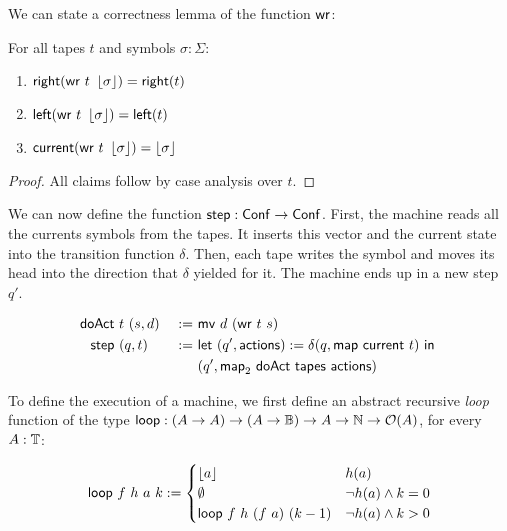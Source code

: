 We can state a correctness lemma of the function $\MS{wr}$:

\begin{fact}[Correctness of $\MS{wr}$]
  \label{lem:write}
  For all tapes $t$ and symbols $\sigma:\Sigma$:
  \begin{enumerate}
  \item $\mathsf{right}   (\mathsf{wr}~t~\left\lfloor {\sigma} \right\rfloor) = \mathsf{right}(t)$
  \item $\mathsf{left}    (\mathsf{wr}~t~\left\lfloor {\sigma} \right\rfloor) = \mathsf{left} (t)$
  \item $\mathsf{current} (\mathsf{wr}~t~\left\lfloor {\sigma} \right\rfloor) = \left\lfloor {\sigma} \right\rfloor$
  \end{enumerate}
\end{fact}
\begin{proof}
  All claims follow by case analysis over $t$.
\end{proof}

We can now define the function $\mathsf{step} : \mathsf{Conf} \rightarrow \mathsf{Conf}$.  First, the machine reads all the currents symbols from the tapes.  It inserts this
vector and the current state into the transition function $\delta$.  Then, each tape writes the symbol and moves its head into the direction that
$\delta$ yielded for it.  The machine ends up in a new step $q'$.

\begin{definition}[$\MS{step}$][step]
  \label{def:step}
  \begin{alignat*}{2}
    \mathsf{doAct} &~t~(s, d) &~:=~& \mathsf{mv}~d~(\mathsf{wr}~t~s) \\
    \mathsf{step}  &~(q, t)   &~:=~& \mathsf{let}~(q', \mathsf{actions}) := \delta(q, \mathsf{map}~\mathsf{current}~t)~\mathsf{in}~ \\
               &          &~  ~& (q', \mathsf{map}_2~\mathsf{doAct}~\mathsf{tapes}~\mathsf{actions})
  \end{alignat*}
\end{definition}

To define the execution of a machine, we first define an abstract recursive \emph{loop} function of the type
$\mathsf{loop} : (A \rightarrow A) \rightarrow (A \rightarrow \mathbb{B}) \rightarrow A \rightarrow \mathbb{N} \rightarrow \mathcal{O}(A)$, for every $A:\mathbb{T}$:

\begin{definition}[$\Loop$][loop]
  \begin{align*}
    \mathsf{loop}~f~h~a~k :=
    \begin{cases}
      \left\lfloor {a} \right\rfloor               & h(a) \\
      \emptyset                  & \lnot h(a) \land k = 0 \\
      \mathsf{loop}~f~h~(f~a)~(k-1)  & \lnot h(a) \land k > 0
    \end{cases}
  \end{align*}
\end{definition}

